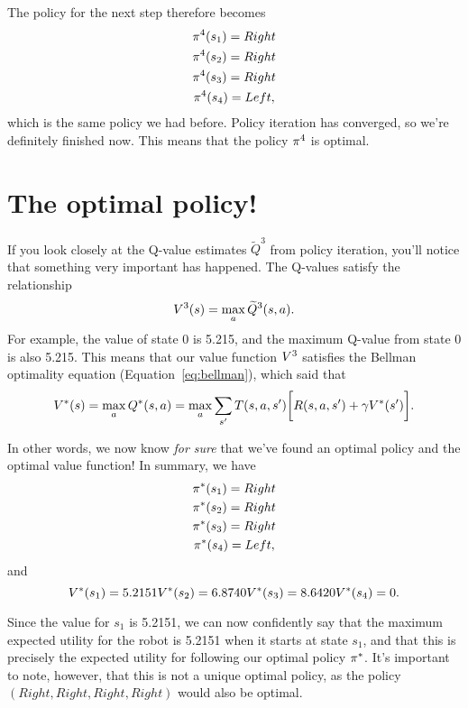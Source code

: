 \documentclass[a4paper]{article}
\begin{document}
The policy for the next step therefore becomes
\begin{gather*}
  \pi^4(s_1) = Right \\
  \pi^4(s_2) = Right \\
  \pi^4(s_3) = Right \\
  \pi^4(s_4) = Left ,
\end{gather*}
which is the same policy we had before.
Policy iteration has converged, so we're definitely finished now.
This means that the policy $\pi^4$ is optimal.

\section{The optimal policy!}
If you look closely at the Q-value estimates $\widetilde{Q}^3$ from policy
iteration,
you'll notice that something very important has happened.
The Q-values satisfy the relationship
\begin{equation*}
  V^3(s) = \operatorname*{max}_a \widetilde{Q}^3(s, a) .
\end{equation*}
For example, the value of state 0 is 5.215, and the maximum Q-value from state
0 is also 5.215.
This means that our value function $V^3$ satisfies the Bellman optimality
equation (Equation~\ref{eq:bellman}), which said that
\begin{equation*}
  V^*(s) = \operatorname*{max}_a Q^*(s, a) = \operatorname*{max}_a \sum_{s'} T(s, a, s') \bigg[ R(s, a, s') + \gamma V^*(s') \bigg] .
\end{equation*}

In other words, we now know \emph{for sure} that we've found an optimal policy
and the optimal value function!
In summary, we have
\begin{gather*}
  \pi^*(s_1) = Right \\
  \pi^*(s_2) = Right \\
  \pi^*(s_3) = Right \\
  \pi^*(s_4) = Left ,
\end{gather*}
and
\begin{equation*}
  V^*(s_1) = 5.2151 \\
  V^*(s_2) = 6.8740 \\
  V^*(s_3) = 8.6420 \\
  V^*(s_4) = 0 .
\end{equation*}

Since the value for $s_1$ is 5.2151, we can now confidently say that
the maximum expected utility for the robot is 5.2151 when it starts at
state $s_1$, and that this is precisely the expected utility for
following our optimal policy $\pi^*$.
It's important to note, however, that this is not a unique optimal policy,
as the policy $(Right, Right, Right, Right)$ would also be optimal.
\end{document}
